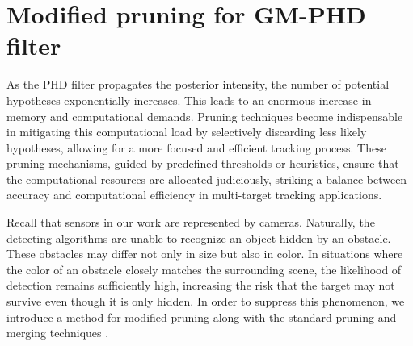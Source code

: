 \section{Modified pruning for GM-PHD filter}
As the PHD filter propagates the posterior intensity, the number of potential hypotheses exponentially increases.
This leads to an enormous increase in memory and computational demands. Pruning techniques become indispensable in
mitigating this computational load by selectively discarding less likely hypotheses, allowing for a more focused and
efficient tracking process. These pruning mechanisms, guided by predefined thresholds or heuristics, ensure that the
computational resources are allocated judiciously, striking a balance between accuracy and computational efficiency in multi-target tracking applications.

Recall that sensors in our work are represented by cameras. Naturally, the detecting algorithms are unable to
recognize an object hidden by an obstacle. These obstacles may differ not only in size but also in color. In
situations where the color of an obstacle closely matches the surrounding scene, the likelihood of detection remains
sufficiently high, increasing the risk that the target may not survive even though it is only hidden. In order to suppress this phenomenon, we introduce a method for modified pruning along with the standard pruning and merging techniques \cite{VoMaPHD2006}.

